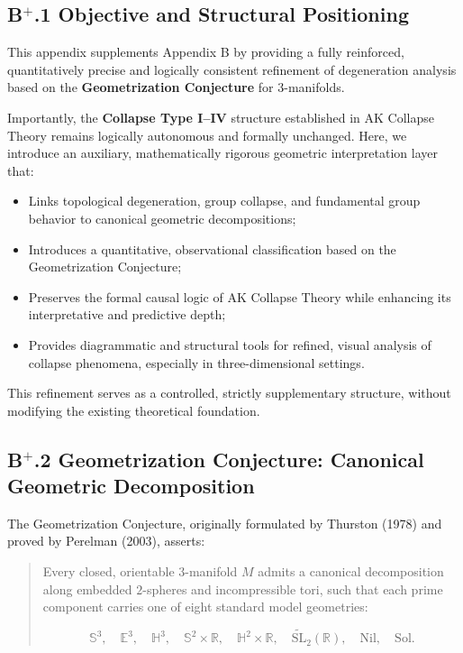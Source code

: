 \documentclass[11pt]{article}
\begin{document}
\subsection*{B$^{+}$.1 Objective and Structural Positioning}

This appendix supplements Appendix B by providing a fully reinforced, quantitatively precise and logically consistent refinement of degeneration analysis based on the \textbf{Geometrization Conjecture} for $3$-manifolds.

Importantly, the \textbf{Collapse Type I–IV} structure established in AK Collapse Theory remains logically autonomous and formally unchanged. Here, we introduce an auxiliary, mathematically rigorous geometric interpretation layer that:

\begin{itemize}
    \item Links topological degeneration, group collapse, and fundamental group behavior to canonical geometric decompositions;
    \item Introduces a quantitative, observational classification based on the Geometrization Conjecture;
    \item Preserves the formal causal logic of AK Collapse Theory while enhancing its interpretative and predictive depth;
    \item Provides diagrammatic and structural tools for refined, visual analysis of collapse phenomena, especially in three-dimensional settings.
\end{itemize}

This refinement serves as a controlled, strictly supplementary structure, without modifying the existing theoretical foundation.

\subsection*{B$^{+}$.2 Geometrization Conjecture: Canonical Geometric Decomposition}

The Geometrization Conjecture, originally formulated by Thurston (1978) and proved by Perelman (2003), asserts:

\begin{quote}
Every closed, orientable $3$-manifold $M$ admits a canonical decomposition along embedded $2$-spheres and incompressible tori, such that each prime component carries one of eight standard model geometries:

\[
\mathbb{S}^3,\quad \mathbb{E}^3,\quad \mathbb{H}^3,\quad \mathbb{S}^2 \times \mathbb{R},\quad \mathbb{H}^2 \times \mathbb{R},\quad \widetilde{\mathrm{SL}}_2(\mathbb{R}),\quad \mathrm{Nil},\quad \mathrm{Sol}.
\]
\end{quote}
\end{document}
